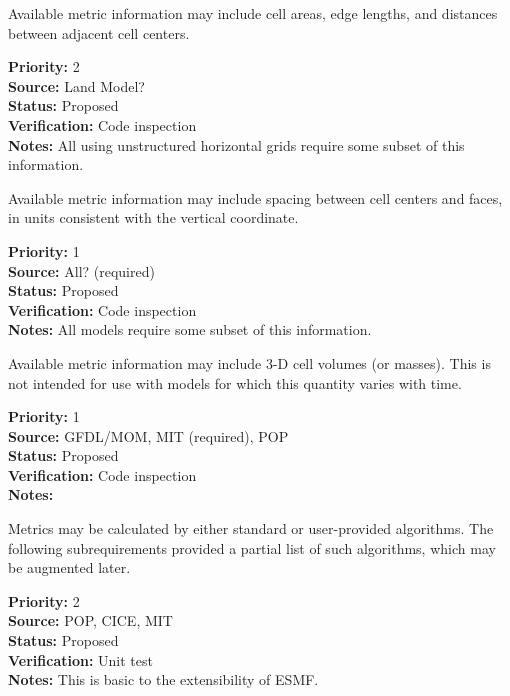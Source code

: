 Available metric information may include cell areas, edge lengths, and distances between
adjacent cell centers.
\begin{reqlist}
{\bf Priority:} 2 \\
{\bf Source:} Land Model? \\
{\bf Status:} Proposed \\
{\bf Verification:} Code inspection \\
{\bf Notes:} All using unstructured horizontal grids require some subset of this
information.
\end{reqlist}

Available metric information may include spacing between cell centers and faces, in
units consistent with the vertical coordinate.
\begin{reqlist}
{\bf Priority:} 1 \\
{\bf Source:} All? (required) \\
{\bf Status:} Proposed \\
{\bf Verification:} Code inspection \\
{\bf Notes:} All models require some subset of this information.
\end{reqlist}

Available metric information may include 3-D cell volumes (or masses).  This is not
intended for use with models for which this quantity varies with time.
\begin{reqlist}
{\bf Priority:} 1 \\
{\bf Source:} GFDL/MOM, MIT (required), POP \\
{\bf Status:} Proposed \\
{\bf Verification:} Code inspection \\
{\bf Notes:} 
\end{reqlist}

Metrics may be calculated by either standard or user-provided algorithms.
The following subrequirements provided a partial list of such algorithms,
which may be augmented later.
\begin{reqlist}
{\bf Priority:} 2 \\
{\bf Source:} POP, CICE, MIT \\
{\bf Status:} Proposed \\
{\bf Verification:} Unit test \\
{\bf Notes:} This is basic to the extensibility of ESMF. 
\end{reqlist}

